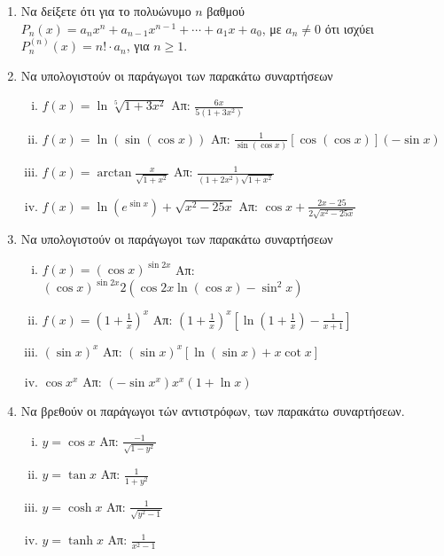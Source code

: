 \begin{enumerate}
  \item Να δείξετε ότι για το πολυώνυμο $n$ βαθμού $ P_{n}(x) =a_{n}x^{n} +
    a_{n-1}x^{n-1} + \cdots + a_{1}x + a_{0} $, με  $ a_{n}\neq 0 $ ότι ισχύει $
    P_{n}^{(n)}(x) = n! \cdot a_{n}$, για  $n\geq 1 $.

  \item Να υπολογιστούν οι παράγωγοι των παρακάτω συναρτήσεων
    \begin{enumerate}[(i)]
      \item $ f(x) = \ln{\sqrt[5]{1+3x^{2}}} $ \hfill Απ: $
        \frac{6x}{5(1+3x^{2})} $
      \item $ f(x) = \ln({\sin({\cos{x}})}) $ \hfill Απ: $
        \frac{1}{\sin{(\cos{x})}} [\cos{(\cos{x})}] (- \sin{x}) $ 
      \item $ f(x) = \arctan \frac{x}{\sqrt{1 + x^{2}}} $ \hfill Απ: $
        \frac{1}{(1+2x^{2})\sqrt{1 + x^{2}}} $
      \item $ f(x) = \ln{(e^{\sin{x}})} + \sqrt{x^{2} - 25x} $ \hfill Απ: $
        \cos{x} + \frac{2x - 25}{2 \sqrt{x^{2} - 25x}}  $  
    \end{enumerate}

  \item  Να υπολογιστούν οι παράγωγοι των παρακάτω συναρτήσεων

    \begin{enumerate}[(i)]
      \item $ f(x) = (\cos{x})^{\sin{2x}} $ \hfill Απ: $
        (\cos{x})^{\sin{2x}} 2(\cos{2x} \ln{(\cos{x})} - \sin^{2}{x}) $
      \item $ f(x) = \left(1 + \frac{1}{x} \right)^{x} $ \hfill Απ: $
        \left(1 + \frac{1}{x}\right)^{x}\left[\ln{(1 + \frac{1}{x})} -
        \frac{1}{x+1}\right] $
      \item $ (\sin{x})^{x} $ \hfill Απ: $ (\sin{x})^{x}[\ln{(\sin{x}
        )} + x \cot{x}] $ 
      \item $ \cos{x}^{x} $ \hfill Απ: $ (- \sin{x^{x}})x^{x} (1 +
        \ln{x}) $
    \end{enumerate}

  \item Να βρεθούν οι παράγωγοι τών αντιστρόφων, των παρακάτω συναρτήσεων.
    \begin{enumerate}[(i)]
      \item $ y = \cos{x} $ \hfill Απ: $ \frac{-1}{\sqrt{1 - y^{2}}} $
      \item $ y = \tan{x} $ \hfill Απ: $ \frac{1}{1 + y^{2}} $
      \item $ y = \cosh{x} $  \hfill Απ: $ \frac{1}{\sqrt{y^{2} - 1}} $
      \item $ y = \tanh{x} $ \hfill Απ: $ \frac{1}{x^{2} - 1} $
    \end{enumerate}


\end{enumerate}
